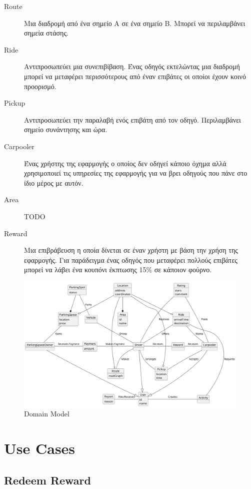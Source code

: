 \documentclass[11pt]{article}
\begin{document}
\begin{description}
    \item[Route]
        Μια διαδρομή από ένα σημείο Α σε ένα σημείο Β. Μπορεί να περιλαμβάνει
        σημεία στάσης.
    \item[Ride]
        Αντιπροσωπεύει μια συνεπιβίβαση. Ένας οδηγός εκτελώντας μια διαδρομή
        μπορεί να μεταφέρει περισσότερους από έναν επιβάτες οι οποίοι έχουν
        κοινό προορισμό.
    \item[Pickup]
        Αντιπροσωπεύει την παραλαβή ενός επιβάτη από τον οδηγό. Περιλαμβάνει
        σημείο συνάντησης και ώρα.
    \item[Carpooler]
        Ένας χρήστης της εφαρμογής ο οποίος δεν οδηγεί κάποιο όχημα αλλά
        χρησιμοποιεί τις υπηρεσίες της εφαρμογής για να βρει οδηγούς που πάνε
        στο ίδιο μέρος με αυτόν.
    \item[Area]
        TODO
    \item[Reward]
        Μια επιβράβευση η οποία δίνεται σε έναν χρήστη με βάση την χρήση της
        εφαρμογής. Για παράδειγμα ένας οδηγός που μεταφέρει πολλούς επιβάτες
        μπορεί να λάβει ένα κουπόνι έκπτωσης 15\% σε κάποιον φούρνο.
\end{description}

\begin{figure}
    \centering
    \includegraphics[width=\textwidth]{domain-model}
    \caption{Domain Model}
\end{figure}

\newpage

\section{Use Cases}

\subsection{Redeem Reward}

\end{document}
